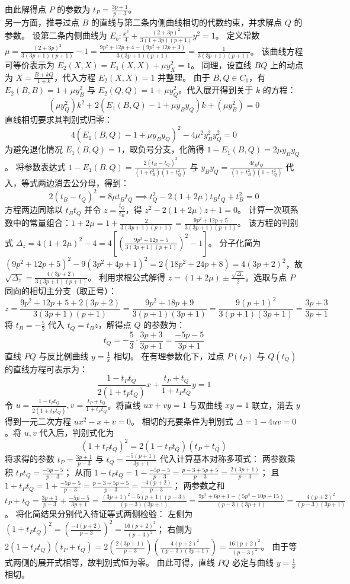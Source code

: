 \begin{solution}
由此解得点 $P$ 的参数为 $t_P = \frac{3p+1}{p-3}$。\\
另一方面，推导过点 $B$ 的直线与第二条内侧曲线相切的代数约束，并求解点 $Q$ 的参数。
设第二条内侧曲线为 $E_b: \frac{x^2}{4} + \frac{(2+3p)^2}{3(1+3p)(p+1)}y^2 = 1$。
定义常数 $\mu = \frac{(2+3p)^2}{3(3p+1)(p+1)} - 1 = \frac{9p^2+12p+4 - (9p^2+12p+3)}{3(3p+1)(p+1)} = \frac{1}{3(3p+1)(p+1)}$。
该曲线方程可等价表示为 $E_2(X,X) = E_1(X,X) + \mu y_X^2 = 1$。
同理，设直线 $BQ$ 上的动点为 $X = \frac{B+kQ}{1+k}$，代入方程 $E_2(X,X) = 1$ 并整理。
由于 $B, Q \in C_1$，有 $E_2(B,B) = 1 + \mu y_B^2$ 与 $E_2(Q,Q) = 1 + \mu y_Q^2$。代入展开得到关于 $k$ 的方程：
$$ (\mu y_Q^2)k^2 + 2(E_1(B,Q) - 1 + \mu y_B y_Q)k + (\mu y_B^2) = 0 $$
直线相切要求其判别式归零：
$$ 4(E_1(B,Q) - 1 + \mu y_B y_Q)^2 - 4\mu^2 y_B^2 y_Q^2 = 0 $$
为避免退化情况 $E_1(B,Q)=1$，取负号分支，化简得 $1 - E_1(B,Q) = 2\mu y_B y_Q$。
将参数表达式 $1 - E_1(B,Q) = \frac{2(t_B - t_Q)^2}{(1+t_B^2)(1+t_Q^2)}$ 与 $y_B y_Q = \frac{4t_B t_Q}{(1+t_B^2)(1+t_Q^2)}$ 代入，等式两边消去公分母，得到：
$$ 2(t_B - t_Q)^2 = 8\mu t_B t_Q \implies t_Q^2 - 2(1+2\mu)t_B t_Q + t_B^2 = 0 $$
方程两边同除以 $t_B t_Q$ 并令 $z = \frac{t_Q}{t_B}$，得 $z^2 - 2(1+2\mu)z + 1 = 0$。
计算一次项系数中的常量组合：$1+2\mu = 1 + \frac{2}{3(3p+1)(p+1)} = \frac{9p^2+12p+5}{3(3p+1)(p+1)}$。
该方程的判别式 $\Delta_z = 4(1+2\mu)^2 - 4 = 4\left[ \left(\frac{9p^2+12p+5}{3(3p+1)(p+1)}\right)^2 - 1 \right]$。
分子化简为 $(9p^2+12p+5)^2 - 9(3p^2+4p+1)^2 = 2(18p^2+24p+8) = 4(3p+2)^2$，故 $\sqrt{\Delta_z} = \frac{4(3p+2)}{3(3p+1)(p+1)}$。
利用求根公式解得 $z = (1+2\mu) \pm \frac{\sqrt{\Delta_z}}{2}$。选取与点 $P$ 同向的相切主分支（取正号）：
$$ z = \frac{9p^2+12p+5 + 2(3p+2)}{3(3p+1)(p+1)} = \frac{9p^2+18p+9}{3(p+1)(3p+1)} = \frac{9(p+1)^2}{3(p+1)(3p+1)} = \frac{3p+3}{3p+1} $$
将 $t_B = -\frac{5}{3}$ 代入 $t_Q = t_B z$，解得点 $Q$ 的参数为：
$$ t_Q = -\frac{5}{3} \cdot \frac{3p+3}{3p+1} = \frac{-5p-5}{3p+1} $$
直线 $PQ$ 与反比例曲线 $y = \frac{1}{x}$ 相切。
在有理参数化下，过点 $P(t_P)$ 与 $Q(t_Q)$ 的直线方程可表示为：
$$ \frac{1-t_P t_Q}{2(1+t_P t_Q)} x + \frac{t_P+t_Q}{1+t_P t_Q} y = 1 $$
令 $u = \frac{1-t_P t_Q}{2(1+t_P t_Q)}, v = \frac{t_P+t_Q}{1+t_P t_Q}$。将直线 $ux+vy=1$ 与双曲线 $xy=1$ 联立，消去 $y$ 得到一元二次方程 $ux^2 - x + v = 0$。
相切的充要条件为判别式 $\Delta = 1 - 4uv = 0$。将 $u, v$ 代入后，判别式化为
$$ (1+t_P t_Q)^2 = 2(1-t_P t_Q)(t_P+t_Q) $$
将求得的参数 $t_P = \frac{3p+1}{p-3}$ 与 $t_Q = \frac{-5(p+1)}{3p+1}$ 代入计算基本对称多项式：
两参数乘积 $t_P t_Q = \frac{-5p-5}{p-3}$；
从而 $1 - t_P t_Q = 1 - \frac{-5p-5}{p-3} = \frac{p-3+5p+5}{p-3} = \frac{2(3p+1)}{p-3}$；
且 $1 + t_P t_Q = 1 + \frac{-5p-5}{p-3} = \frac{p-3-5p-5}{p-3} = \frac{-4(p+2)}{p-3}$；
两参数之和 $t_P + t_Q = \frac{3p+1}{p-3} + \frac{-5p-5}{3p+1} = \frac{(3p+1)^2 - 5(p+1)(p-3)}{(p-3)(3p+1)} = \frac{9p^2+6p+1 - (5p^2-10p-15)}{(p-3)(3p+1)} = \frac{4(p+2)^2}{(p-3)(3p+1)}$。
将化简结果分别代入待证等式两侧检验：
左侧为 $(1+t_P t_Q)^2 = \left( \frac{-4(p+2)}{p-3} \right)^2 = \frac{16(p+2)^2}{(p-3)^2}$；
右侧为 $2(1-t_P t_Q)(t_P+t_Q) = 2 \left( \frac{2(3p+1)}{p-3} \right) \left( \frac{4(p+2)^2}{(p-3)(3p+1)} \right) = \frac{16(p+2)^2}{(p-3)^2}$。
由于等式两侧的展开式相等，故判别式恒为零。
由此可得，直线 $PQ$ 必定与曲线 $y = \frac{1}{x}$ 相切。
\end{solution}

